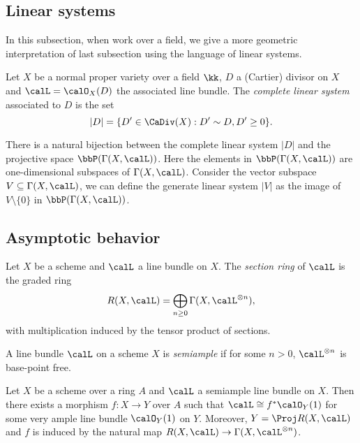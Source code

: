 \subsection{Linear systems}

    In this subsection, when work over a field, we give a more geometric interpretation of last subsection using the language of linear systems.

    \begin{definition}\label{def:geometric_complete_linear_system}
        Let \(X\) be a normal proper variety over a field \(\kk\), \(D\) a (Cartier) divisor on \(X\) and \(\calL=\calO_X(D)\) the associated line bundle.
        The \emph{complete linear system} associated to \(D\) is the set 
        \[ |D| = \{D'\in \CaDiv(X) : D'\sim D, D' \geq 0\}. \]
    \end{definition}

    There is a natural bijection between the complete linear system \(|D|\) and the projective space \(\bbP(\Gamma(X,\calL))\).
    Here the elements in \(\bbP(\Gamma(X,\calL))\) are one-dimensional subspaces of \(\Gamma(X,\calL)\).
    Consider the vector subspace \(V\subseteq \Gamma(X,\calL)\), we can define the generate linear system \(|V|\) as the image of \(V\setminus \{0\}\) in \(\bbP(\Gamma(X,\calL))\).

\subsection{Asymptotic behavior}

    \begin{definition}\label{def:section_ring}
        Let \(X\) be a scheme and \(\calL\) a line bundle on \(X\).
        The \emph{section ring} of \(\calL\) is the graded ring
        \[
            R(X,\calL) = \bigoplus_{n\ge 0} \Gamma(X,\calL^{\otimes n}),
        \]
        with multiplication induced by the tensor product of sections.
        
    \end{definition}

    \begin{definition}\label{def:semiample_line_bundle}
        A line bundle \(\calL\) on a scheme \(X\) is \emph{semiample} if for some \(n>0\), \(\calL^{\otimes n}\) is base-point free.
        
    \end{definition}

    \begin{theorem}\label{thm:fibration_associated_to_semiample_line_bundle}
        Let \(X\) be a scheme over a ring \(A\) and \(\calL\) a semiample line bundle on \(X\).
        Then there exists a morphism \(f:X\to Y\) over \(A\) such that \(\calL\cong f^*\calO_Y(1)\) for some very ample line bundle \(\calO_Y(1)\) on \(Y\).
        Moreover, \(Y=\Proj R(X,\calL)\) and \(f\) is induced by the natural map \(R(X,\calL)\to \Gamma(X,\calL^{\otimes n})\).
        
    \end{theorem}

